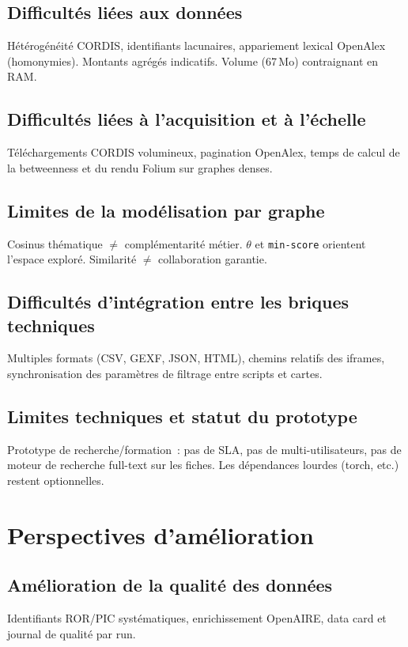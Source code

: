 \documentclass[12pt,a4paper,oneside]{article}
\begin{document}
\subsection{Difficultés liées aux données}
Hétérogénéité CORDIS, identifiants lacunaires, appariement lexical OpenAlex (homonymies). Montants agrégés indicatifs. Volume  (67\,Mo) contraignant en RAM.

\subsection{Difficultés liées à l'acquisition et à l'échelle}
Téléchargements CORDIS volumineux, pagination OpenAlex, temps de calcul de la betweenness et du rendu Folium sur graphes denses.

\subsection{Limites de la modélisation par graphe}
Cosinus thématique $\neq$ complémentarité métier. $\theta$ et \texttt{min-score} orientent l'espace exploré. Similarité $\neq$ collaboration garantie.

\subsection{Difficultés d'intégration entre les briques techniques}
Multiples formats (CSV, GEXF, JSON, HTML), chemins relatifs des iframes, synchronisation des paramètres de filtrage entre scripts et cartes.

\subsection{Limites techniques et statut du prototype}
Prototype de recherche/formation~: pas de SLA, pas de multi-utilisateurs, pas de moteur de recherche full-text sur les fiches. Les dépendances lourdes (torch, etc.) restent optionnelles.

\section{Perspectives d'amélioration}

\subsection{Amélioration de la qualité des données}
Identifiants ROR/PIC systématiques, enrichissement OpenAIRE, data card et journal de qualité par run.
\end{document}
